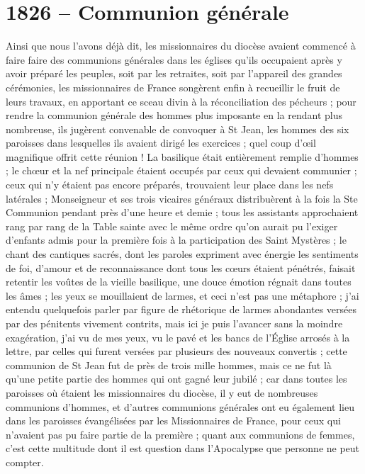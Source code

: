\documentclass[11pt,a4paper]{report}
\begin{document}
\section*{1826 -- Communion générale}

Ainsi que nous l'avons déjà dit, les missionnaires du diocèse avaient commencé à faire faire des communions générales dans les églises qu'ils occupaient après y avoir préparé les peuples, soit par les retraites, soit par l'appareil des grandes cérémonies, les missionnaires de France songèrent enfin à recueillir le fruit de leurs travaux, en apportant ce sceau divin à la réconciliation des pécheurs ; pour rendre la communion générale des hommes plus imposante en la rendant plus nombreuse, ils jugèrent convenable de convoquer à St Jean, les hommes des six paroisses dans lesquelles ils avaient dirigé les exercices ; quel coup d'œil magnifique offrit cette réunion ! La basilique était entièrement remplie d'hommes ; le chœur et la nef principale étaient occupés par ceux qui devaient communier ; ceux qui n'y étaient pas encore préparés, trouvaient leur place dans les nefs latérales ; Monseigneur et ses trois vicaires généraux distribuèrent à la fois la Ste Communion pendant près d'une heure et demie ; tous les assistants approchaient rang par rang de la Table sainte avec le même ordre qu'on aurait pu l'exiger d'enfants admis pour la première fois à la participation des Saint Mystères ; le chant des cantiques sacrés, dont les paroles expriment avec énergie les sentiments de foi, d'amour et de reconnaissance dont tous les cœurs étaient pénétrés, faisait retentir les voûtes de la vieille basilique, une douce émotion régnait dans toutes les âmes ; les yeux se mouillaient de larmes, et ceci n'est pas une métaphore ; j'ai entendu quelquefois parler par figure de rhétorique de larmes abondantes versées par des pénitents vivement contrits, mais ici je puis l'avancer sans la moindre exagération, j'ai vu de mes yeux, vu le pavé et les bancs de l'Église arrosés à la lettre, par celles qui furent versées par plusieurs des nouveaux convertis ; cette communion de St Jean fut de près de trois mille hommes, mais ce ne fut là qu'une petite partie des hommes qui ont gagné leur jubilé ; car dans toutes les paroisses où étaient les missionnaires du diocèse, il y eut de nombreuses communions d'hommes, et d'autres communions générales ont eu également lieu dans les paroisses évangélisées par les Missionnaires de France, pour ceux qui n'avaient pas pu faire partie de la première ; quant aux communions de femmes, c'est cette multitude dont il est question dans l'Apocalypse que personne ne peut compter.
\end{document}
